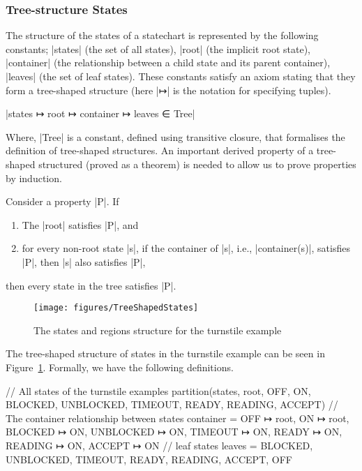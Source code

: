 \subsubsection{Tree-structure States} The structure of the states of a statechart is represented by  the following constants; |states| (the set of all states), |root| (the implicit root state), |container| (the relationship between a child state and its parent container), |leaves| (the set of leaf states). 
These constants satisfy an axiom stating that they form a tree-shaped structure (here |↦| is the notation for specifying tuples).
\begin{center}
    |states ↦ root ↦ container ↦ leaves ∈ Tree|
\end{center}
Where, |Tree| is a constant, defined using transitive closure, that formalises the definition of tree-shaped structures. 
An important derived property of a tree-shaped structured (proved as a theorem) is needed to allow us to prove properties by induction.
\begin{theorem}
\label{thm:tree-induction}
    Consider a property |P|. If 
    \begin{enumerate}
        \item The |root| satisfies |P|, and
        \item for every non-root state |s|, if the container of |s|, i.e., |container(s)|, satisfies |P|, then |s| also satisfies |P|,
    \end{enumerate}
    then every state in the tree satisfies |P|.
\end{theorem}
\begin{figure}
    \centering
    \texttt{[image: figures/TreeShapedStates]}
    \caption{The states and regions structure for the turnstile example}
    \label{fig:turnstile-tree-shaped}
\end{figure}

\begin{example}
    The tree-shaped structure of states in the turnstile example can be seen in Figure~\ref{fig:turnstile-tree-shaped}.
    Formally, we have the following definitions.   
\begin{EventBcode}
// All states of the turnstile examples
partition(states, {root}, {OFF}, {ON}, {BLOCKED}, {UNBLOCKED}, {TIMEOUT},
    {READY}, {READING}, {ACCEPT})
// The container relationship between states
container = {OFF ↦ root, ON ↦ root, BLOCKED ↦ ON, UNBLOCKED ↦ ON,
    TIMEOUT ↦ ON, READY ↦ ON, READING ↦ ON, ACCEPT ↦ ON}
// leaf states
leaves = {BLOCKED, UNBLOCKED, TIMEOUT, READY, READING, ACCEPT, OFF}
\end{EventBcode}
\end{example}

